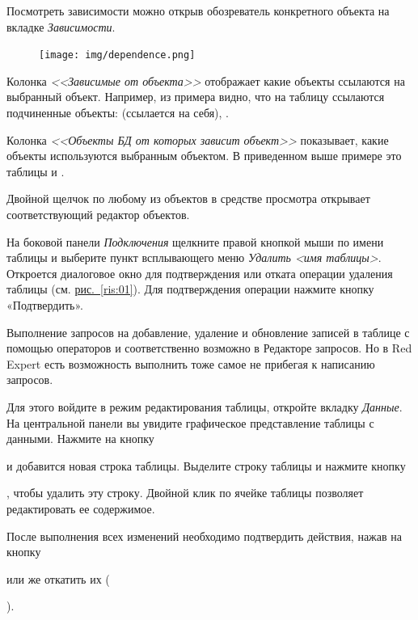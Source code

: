 Посмотреть зависимости можно открыв обозреватель конкретного объекта на вкладке \textit{Зависимости}.

\begin{figure}[H]
	\centering
	\texttt{[image: img/dependence.png]}
\end{figure}

Колонка \textit{<<Зависимые от объекта>>} отображает какие объекты ссылаются на выбранный объект. Например, из примера видно, что на таблицу  ссылаются подчиненные объекты:  (ссылается на себя), .


Колонка \textit{<<Объекты БД от которых зависит объект>>} показывает, какие объекты используются выбранным объектом. В приведенном выше примере это таблицы  и .

Двойной щелчок по любому из объектов в средстве просмотра открывает соответствующий редактор объектов.

На боковой панели \textit{Подключения} щелкните правой кнопкой мыши по имени таблицы и выберите пункт всплывающего меню \textit{Удалить <имя таблицы>}. Откроется  диалоговое окно для подтверждения или отката операции удаления таблицы (см. \hyperref[ris:01]{рис.~\ref{ris:01}}). Для подтверждения операции нажмите кнопку «Подтвердить».

Выполнение запросов на добавление, удаление и обновление записей в таблице с помощью операторов  и  соответственно возможно в Редакторе запросов. Но в Red Expert есть возможность выполнить тоже самое не прибегая к написанию запросов.

Для этого войдите в режим редактирования таблицы, откройте вкладку \textit{Данные}. На центральной панели вы увидите графическое представление таблицы с данными. Нажмите на кнопку  и добавится новая строка таблицы. Выделите строку таблицы и нажмите кнопку , чтобы удалить эту строку. Двойной клик по ячейке таблицы позволяет редактировать ее содержимое. 

После выполнения всех изменений необходимо подтвердить действия, нажав на кнопку  или же откатить их ().

